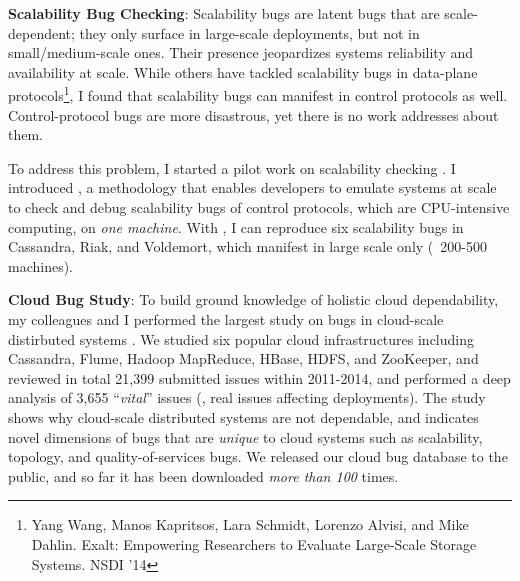\documentclass[10pt]{article}
\begin{document}
\noindent
\textbf{Scalability Bug Checking}: Scalability bugs are latent bugs that are
scale-dependent; they only surface in large-scale deployments, but not in
small/medium-scale ones. Their presence jeopardizes systems reliability and
availability at scale. 
%
While others have tackled scalability bugs in data-plane protocols\footnote{Yang
Wang, Manos Kapritsos, Lara Schmidt, Lorenzo Alvisi, and Mike Dahlin.
Exalt: Empowering Researchers to Evaluate Large-Scale Storage Systems. NSDI
'14}, I found that scalability bugs can manifest in control protocols as well.
Control-protocol bugs are more disastrous, yet there is no work addresses about
them.
 
To address this problem, I started a pilot work on scalability checking
\cite{Gunawi+17-SCk-Insub,Leesatapornwongsa+17-SCk-InPrep}. I introduced \sck, a
methodology that enables developers to emulate systems at scale to check and
debug scalability bugs of control protocols, which are CPU-intensive computing,
on \textit{one machine}. 
%
With \sck, I can reproduce six scalability bugs in Cassandra, Riak, and
Voldemort, which manifest in large scale only (\eg\ 200-500 machines). 


\noindent
\textbf{Cloud Bug Study}: To build ground knowledge of holistic cloud
dependability, my colleagues and I performed the largest study on bugs in
cloud-scale distirbuted systems \cite{Gunawi+14-Cbs}. We studied six popular
cloud infrastructures including Cassandra, Flume, Hadoop MapReduce, HBase, HDFS,
and ZooKeeper, and reviewed in total 21,399 submitted issues within 2011-2014,
and performed a deep analysis of 3,655 ``\textit{vital}'' issues (\ie, real
issues affecting deployments). The study shows why cloud-scale distributed
systems are not dependable, and indicates novel dimensions of bugs that are
\textit{unique} to cloud systems such as scalability, topology, and
quality-of-services bugs. We released our cloud bug database to the public, and
so far it has been downloaded \textit{more than 100} times.


\end{document}
